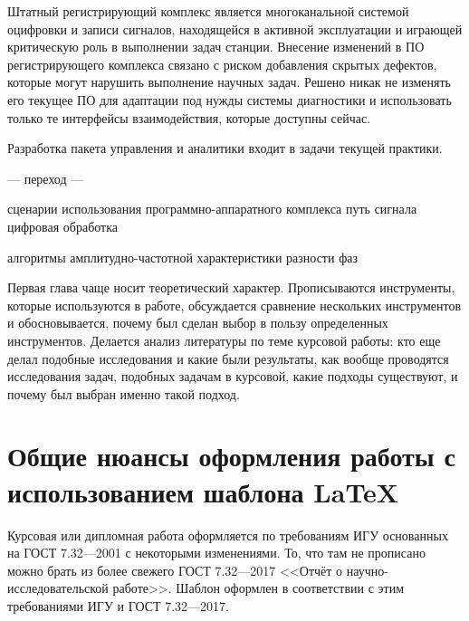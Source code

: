 \documentclass{report}
\begin{document}
Штатный регистрирующий комплекс является многоканальной системой оцифровки и записи сигналов, находящейся в активной эксплуатации и играющей критическую роль в выполнении  задач станции. Внесение изменений в ПО регистрирующего комплекса связано с риском добавления скрытых дефектов, которые могут нарушить выполнение научных задач. Решено никак не изменять его текущее ПО для адаптации под нужды системы диагностики и использовать только те интерфейсы взаимодействия, которые доступны сейчас.

Разработка пакета управления и аналитики входит в задачи текущей практики.



--- переход ---

сценарии использования программно-аппаратного комплекса
путь сигнала
цифровая обработка

алгоритмы
    амплитудно-частотной характеристики
    разности фаз



Первая глава чаще носит теоретический характер. Прописываются инструменты, которые используются в работе, обсуждается сравнение нескольких инструментов и обосновывается, почему был сделан выбор в пользу определенных инструментов. Делается анализ литературы по теме курсовой работы: кто еще делал подобные исследования и какие были результаты, как вообще проводятся исследования задач, подобных задачам в курсовой, какие подходы существуют, и почему был выбран именно такой подход.

\section{Общие нюансы оформления работы с использованием шаблона \LaTeX}
Курсовая или дипломная работа оформляется по требованиям ИГУ основанных на ГОСТ 7.32---2001 с некоторыми изменениями. То, что там не прописано можно брать из более свежего ГОСТ 7.32---2017 <<Отчёт о научно-исследовательской работе>>. Шаблон оформлен в соответствии с этим требованиями ИГУ и ГОСТ 7.32---2017. 
\end{document}
